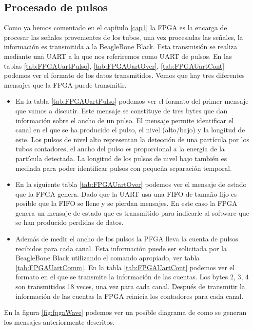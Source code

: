 	\subsection{Procesado de pulsos}
		Como ya hemos comentado en el capítulo \ref{cap1} la FPGA es la encarga de procesar las señales provenientes de los tubos, una vez
		procesadas las señales, la información es transmitida a la BeagleBone Black. Esta transmisión se realiza mediante una UART a la que
		nos referiremos como UART de pulsos. En las tablas \ref{tab:FPGAUartPulso}, \ref{tab:FPGAUartOver}, \ref{tab:FPGAUartCont} podemos ver
		el formato de los datos transmitidos. Vemos que hay tres diferentes mensajes que la FPGA puede transmitir.
		\begin{itemize}
			\item	En la tabla \ref{tab:FPGAUartPulso} podemos ver el formato del primer mensaje que vamos a discutir. Este mensaje se
				constituye de tres bytes que dan información sobre el ancho de un pulso. El mensaje permite identificar el canal en el
				que se ha producido el pulso, el nivel (alto/bajo) y la longitud de este. Los pulsos de nivel alto representan la
				detección de una partícula por los tubos contadores, el ancho del pulso es proporcional a la energía de la partícula
				detectada. La longitud de los pulsos de nivel bajo también es mediada para poder identificar pulsos con pequeña
				separación temporal.
			\item 	En la siguiente tabla \ref{tab:FPGAUartOver} podemos ver el mensaje de estado que la FPGA genera. Dado que la UART usa
				una FIFO de tamaño fijo es posible que la FIFO se llene y se pierdan mensajes. En este caso la FPGA genera un mensaje
				de estado que es transmitido para indicarle al software que se han producido perdidas de datos.
			\item	Además de medir el ancho de los pulsos la PFGA lleva la cuenta de pulsos recibidos para cada canal. Esta información
				puede ser solicitada por la BeagleBone Black utilizando el comando apropiado, ver tabla \ref{tab:FPGAUartComm}. En la
				tabla \ref{tab:FPGAUartCont} podemos ver el formato en el que se transmite la información de las cuentas. Los bytes 2,
				3, 4 son transmitidos 18 veces, una vez para cada canal. Después de transmitir la información de las cuentas la FPGA
				reinicia los contadores para cada canal.
		\end{itemize}
		En la figura \ref{fig:fpgaWave} podemos ver un posible diagrama de como se generan los mensajes anteriormente descritos.

